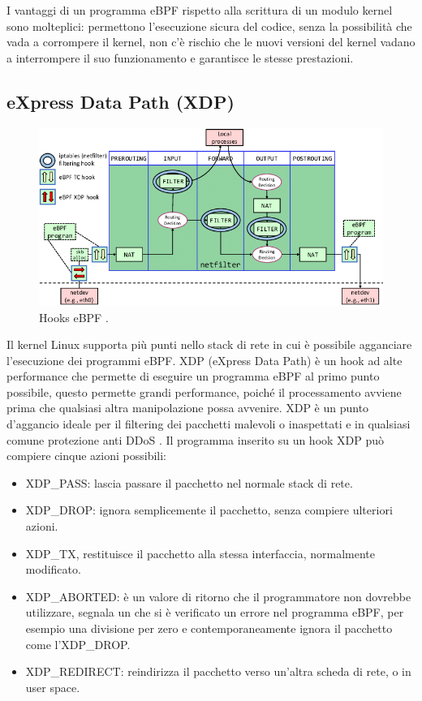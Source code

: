 I vantaggi di un programma eBPF rispetto alla scrittura di un modulo kernel sono molteplici: permettono l'esecuzione sicura del codice, senza la possibilità che vada a corrompere il kernel, non c'è rischio che le nuovi versioni del kernel vadano a interrompere il suo funzionamento e garantisce le stesse prestazioni.


\subsection{eXpress Data Path (XDP)}
\begin{figure}[]
    \label{fig:hooks}
    \includegraphics[width=\hsize]{images/mitigazione/hooks.png}
    \caption{Hooks eBPF \cite{risso_ebpf}.}
    \centering
\end{figure}
Il kernel Linux supporta più punti nello stack di rete in cui è possibile agganciare l'esecuzione dei programmi eBPF.
XDP (eXpress Data Path) è un hook ad alte performance che permette di eseguire un programma eBPF al primo punto possibile, questo permette grandi performance, poiché il processamento avviene prima che qualsiasi altra manipolazione possa avvenire. XDP è un punto d'aggancio ideale per il filtering dei pacchetti malevoli o inaspettati e in qualsiasi comune protezione anti DDoS \cite{cilium_xdp}.
Il programma inserito su un hook XDP può compiere cinque azioni possibili:
\begin{itemize}
    \item XDP\_PASS: lascia passare il pacchetto nel normale stack di rete.
    \item XDP\_DROP: ignora semplicemente il pacchetto, senza compiere ulteriori azioni.
    \item XDP\_TX, restituisce il pacchetto alla stessa interfaccia, normalmente modificato.
    \item XDP\_ABORTED: è un valore di ritorno che il programmatore non dovrebbe utilizzare, segnala un che si è verificato un errore nel programma eBPF, per esempio una divisione per zero e contemporaneamente ignora il pacchetto come l'XDP\_DROP.
    \item XDP\_REDIRECT: reindirizza il pacchetto verso un'altra scheda di rete, o in user space.
\end{itemize}


